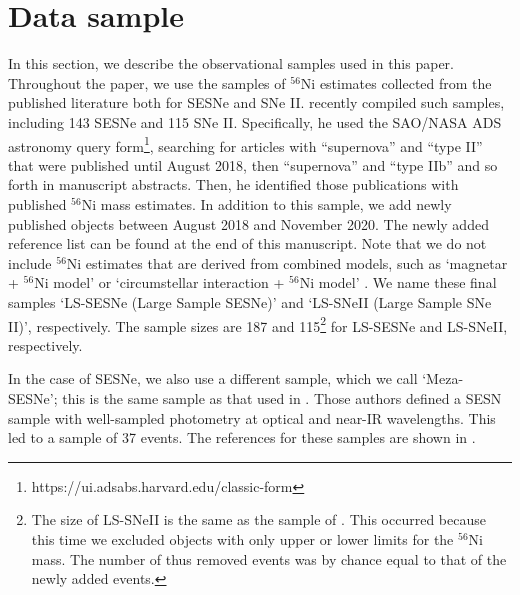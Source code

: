 \documentclass[twocolumn, linenumbers]{aastex62}
\begin{document}

\section{Data sample} \label{sec:sample}
In this section, we describe the observational samples used in this paper. Throughout the paper, we use the 
samples of $^{56}$Ni estimates collected from the published literature both for SESNe and SNe II. \citet{2019A&A...628A...7A} recently compiled such samples, including 143 SESNe and 115 SNe II. Specifically, he used the SAO/NASA ADS astronomy query form\footnote{https://ui.adsabs.harvard.edu/classic-form}, searching for articles with “supernova” and “type II” that were published until August 2018, then “supernova” and “type IIb” and so forth in manuscript abstracts. 
Then, he identified those publications with published $^{56}$Ni mass estimates. In addition to this sample, we add newly published objects between August 2018 and November 2020.
The newly added reference list can be found at the end of this manuscript. Note that we do not include $^{56}$Ni estimates that are derived from combined models, such as `magnetar + $^{56}$Ni model' or `circumstellar interaction + $^{56}$Ni model' \citep[e.g.][]{2020MNRAS.497.3770G}. 
We name these final samples `LS-SESNe (Large Sample SESNe)' and `LS-SNeII (Large Sample SNe II)', respectively. The sample sizes are 187 and 115\footnote{The size of LS-SNeII is the same as the sample of \citet{2019A&A...628A...7A}. This occurred because this time we excluded objects with only upper or lower limits for the $^{56}$Ni mass. The number of thus removed events was by chance equal to that of the newly added events.} for LS-SESNe and LS-SNeII, respectively.

In the case of SESNe, we also use a different sample, which we call `Meza-SESNe'; this is the same sample as that used in \citet{2020A&A...641A.177M}. 
Those authors defined a SESN sample with well-sampled photometry at optical and near-IR wavelengths. This led to a sample of 37 events. %
The references for these samples are shown in \citet{2020A&A...641A.177M}.
\end{document}
